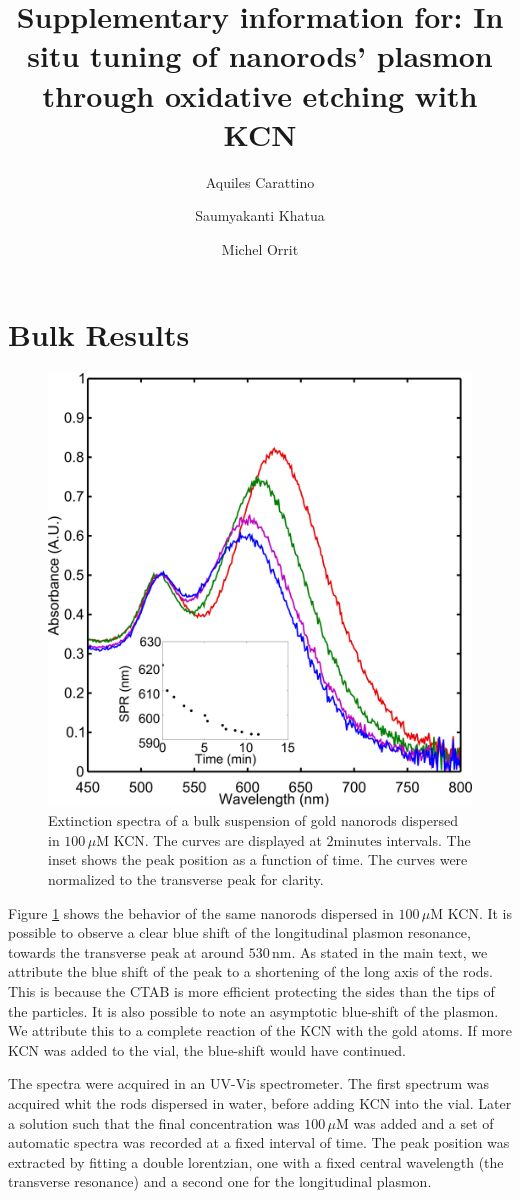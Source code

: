 \documentclass[a4paper,oneside,onecolumn]{article}
\title{Supplementary information for: In situ tuning of nanorods' plasmon
through oxidative etching with KCN}
\author[1]{Aquiles Carattino}
\author[2]{Saumyakanti Khatua}
\author[1]{Michel Orrit}
\affil[1]{Leiden Institute of Physics, Leiden, The Netherlands}
\affil[2]{Indian Institute of Technology- Gandhinagar, Ahmedabad,  India}
\newcommand{\nm}{\ensuremath{\,\textrm{nm}}}
\newcommand{\uM}{\ensuremath{\,\mu\textrm{M}}}
\begin{document}
\maketitle

\section{Bulk Results}
\begin{figure}[tp]
 \centering
 \includegraphics[width=0.45\linewidth]{Figures/04_Supporting/01_Bulk/01_bulk.png}
 \caption{Extinction spectra of a bulk suspension of gold nanorods dispersed in
 $100\uM$ KCN. The curves are displayed at $2\textrm{minutes}$ intervals. The
 inset shows the peak position as a function of time. The curves were normalized
 to the transverse peak for clarity.}
 \label{fig:Bulk}
\end{figure}

Figure \ref{fig:Bulk} shows the behavior of the same nanorods dispersed in
$100\uM$ KCN. It is possible to observe a clear blue shift of the longitudinal
plasmon resonance, towards the transverse peak at around $530\nm$. As stated in
the main text, we attribute the blue shift of the peak to a shortening of the
long axis of the rods. This is because the CTAB is more efficient protecting the
sides than the tips of the particles. It is also possible to note an asymptotic
blue-shift of the plasmon. We attribute this to a complete reaction of the KCN
with the gold atoms. If more KCN was added to the vial, the blue-shift would
have continued. 

The spectra were acquired in an UV-Vis spectrometer. The first spectrum was
acquired whit the rods dispersed in water, before adding KCN into the vial.
Later a solution such that the final concentration was $100\uM$ was added and a
set of automatic spectra was recorded at a fixed interval of time. The peak
position was extracted by fitting a double lorentzian, one with a fixed central
wavelength (the transverse resonance) and a second one for the longitudinal
plasmon.
\end{document}
